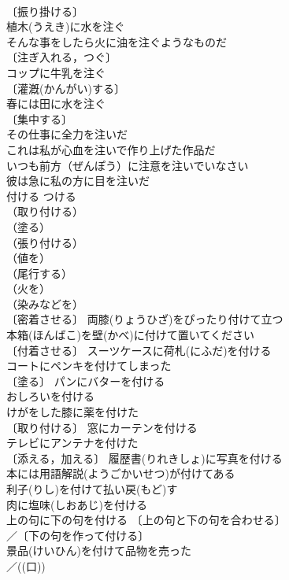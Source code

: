 \documentclass[8pt]{extreport}
\begin{document}
\begin{CJK}{UTF8}{min}
\\	〔振り掛ける〕
\\	植木(うえき)に水を注ぐ 
\\	そんな事をしたら火に油を注ぐようなものだ 
\\	〔注ぎ入れる，つぐ〕
\\	コップに牛乳を注ぐ 
\\	〔灌漑(かんがい)する〕
\\	春には田に水を注ぐ 
\\	〔集中する〕
\\	その仕事に全力を注いだ 
\\	これは私が心血を注いで作り上げた作品だ 
\\	いつも前方（ぜんぽう）に注意を注いでいなさい 
\\	彼は急に私の方に目を注いだ 
\\	付ける	つける	
\\	（取り付ける）
\\	（塗る）
\\	（張り付ける）
\\	（値を）
\\	（尾行する）
\\	（火を）
\\	（染みなどを）
\\	〔密着させる〕 両膝(りょうひざ)をぴったり付けて立つ 
\\	本箱(ほんばこ)を壁(かべ)に付けて置いてください 
\\	〔付着させる〕 スーツケースに荷札(にふだ)を付ける 
\\	コートにペンキを付けてしまった 
\\	〔塗る〕 パンにバターを付ける 
\\	おしろいを付ける 
\\	けがをした膝に薬を付けた 
\\	〔取り付ける〕 窓にカーテンを付ける 
\\	テレビにアンテナを付けた 
\\	〔添える，加える〕 履歴書(りれきしょ)に写真を付ける 
\\	本には用語解説(ようごかいせつ)が付けてある 
\\	利子(りし)を付けて払い戻(もど)す 
\\	肉に塩味(しおあじ)を付ける 
\\	上の句に下の句を付ける 〔上の句と下の句を合わせる〕
\\	／〔下の句を作って付ける〕
\\	景品(けいひん)を付けて品物を売った 
\\	／((口)) 

\end{CJK}
\end{document}
